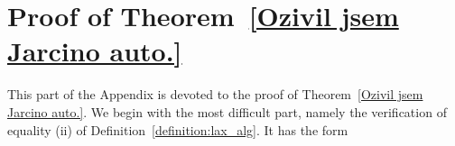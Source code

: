 \documentclass[12pt,leqno]{amsart}
\theoremstyle{definition}
\newcommand{\NN}{\mathbb{N}}
\newcommand{\4}{\texttt{4}}
\renewcommand{\phi}{\varphi}
\begin{document}
\section{Proof of Theorem~\ref{Ozivil jsem Jarcino auto.}}
\label{Ta nova strecha muj program tohoto tydne velmi zahustuje.}


\def\OOO{A_{000}}      \def\OAO{f_{0?0}}  \def\BB{\phi_B}
\def\OIO{A_{010}}      \def\OIA{f_{01?}}  \def\EE{\phi_E}
\def\OII{A_{011}}      \def\AII{f_{?11}}  \def\SS{\phi_S}
\def\IIO{A_{110}}      \def\AOO{f_{?00}}  \def\NN{\phi_N}
\def\III{A_{111}}      \def\IAI{f_{1?1}}  \def\WW{\phi_W}
\def\IOO{A_{100}}      \def\IOA{f_{10?}}  \def\FF{\phi_F}
\def\IOI{A_{101}}      \def\IIA{f_{11?}}
\def\OOI{A_{001}}      \def\AIO{f_{?10}}
\def\IAO{f_{1?0}}
\def\OOA{f_{00?}}
\def\AOI{f_{?01}} 
\def\OAI{f_{0?1}} 
This part of the Appendix is devoted to the proof of 
Theorem~\ref{Ozivil jsem Jarcino auto.}. 
We begin with the most difficult part, namely the verification
of equality (ii) of Definition~\ref{definition:lax_alg}.
It has the form
\end{document}
